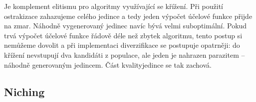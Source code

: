 Je komplement elitismu pro algoritmy využívající se křížení. Při použití ostrakizace zahazujeme celého jedince a tedy jeden výpočet účelové funkce přijde na zmar. Náhodně vygenerovaný jedinec navíc bývá velmi suboptimální. Pokud trvá výpočet účelové funkce řádově déle než zbytek algoritmu, tento postup si nemůžeme dovolit a při implementaci diverzifikace se postupuje opatrněji: do křížení nevstupují dva kandidáti z populace, ale jeden je nahrazen parazitem -- náhodně generovaným jedincem. Část \bq kvality\eq jedince se tak zachová.

\subsection{Niching}


 